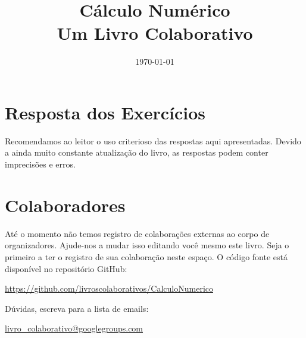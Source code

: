 \documentclass[12pt]{book}
\begin{document}
\frontmatter

\title{Cálculo Numérico\\\small{Um Livro Colaborativo}}
\author{}
\date{\today}

\ifishtml
\else
\AddToShipoutPicture*{\BackgroundPic}
\fi
\maketitle






\ifisslide
\tableofcontents
\else
\tableofcontents
{}
\fi

\mainmatter










\ifisscilab
\appendix

\fi

\ifishtml
\else
\chapter*{Resposta dos Exercícios}
Recomendamos ao leitor o uso criterioso das respostas aqui apresentadas. Devido a ainda muito constante atualização do livro, as respostas podem conter imprecisões e erros.

\shipoutAnswer  
\fi

\nocite{*}




\chapter*{Colaboradores}

Até o momento não temos registro de colaborações externas ao corpo de organizadores. Ajude-nos a mudar isso editando você mesmo este livro. Seja o primeiro a ter o registro de sua colaboração neste espaço. O código fonte está disponível no repositório GitHub:
\begin{center}
  \url{https://github.com/livroscolaborativos/CalculoNumerico}
\end{center}
Dúvidas, escreva para a lista de emails:
\begin{center}
  \url{livro_colaborativo@googlegroups.com}
\end{center}

\ifishtml
\else
\clearpage
{}
\printindex
\fi
\end{document}
